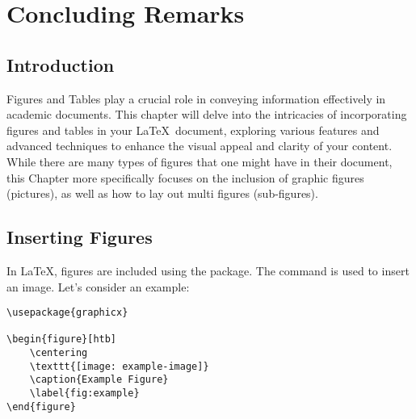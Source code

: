 \chapter{Concluding Remarks}\label{ch:4}
	\section{Introduction}
		Figures and Tables play a crucial role in conveying information effectively in academic documents. 
		This chapter will delve into the intricacies of incorporating figures and tables in your \LaTeX\ document, exploring various features and advanced techniques to enhance the visual appeal and clarity of your content.
		While there are many types of figures that one might have in their document, this Chapter more specifically focuses on the inclusion of graphic figures (pictures), as well as how to lay out multi figures (sub-figures).



	\section{Inserting Figures}
		In \LaTeX, figures are included using the  package. 
		The  command is used to insert an image. 
		Let's consider an example:

		\begin{lstlisting}[float=ht,caption=A Basic Example of Including a Figure.,label=lst:figureExample,style=LaTeXStyle,basicstyle=\small\ttfamily,]
\usepackage{graphicx}

\begin{figure}[htb]
	\centering
	\texttt{[image: example-image]}
	\caption{Example Figure}
	\label{fig:example}
\end{figure}
		\end{lstlisting}


